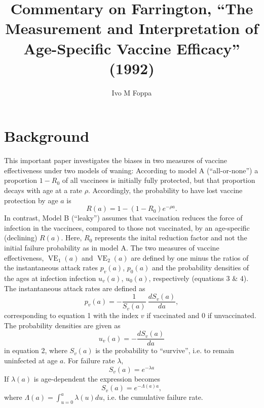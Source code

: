 \documentclass{article}[11pt]
\title{Commentary on Farrington, ``The Measurement and Interpretation of Age-Specific Vaccine Efficacy'' (1992)}
\author{Ivo M Foppa}
\begin{document}
	
\maketitle%
%
%
\section*{Background} 
This important paper investigates the biases in two measures of vaccine effectiveness under two models of waning: According to model A (``all-or-none'') a proportion $1-R_0$ of all vaccinees is initially fully protected, but that proportion decays with age at a rate $\rho$. Accordingly, the probability to have lost vaccine protection by age $a$ is
%
\begin{equation}
\label{eq:Ra}
R(a) = 1-(1-R_0) e^{-\rho a}.
\end{equation}
%
In contrast, Model B (``leaky'') assumes that vaccination reduces the force of infection in the vaccinees, compared to those not vaccinated, by an age-specific (declining) $R(a)$. Here, $R_0$ represents the inital reduction factor and not the initial failure probability as in model A.
The two measures of vaccine effectiveness, $\operatorname{VE}_1(a)$ and $\operatorname{VE}_2(a)$ are defined by one minus the ratios of the instantaneous attack rates $p_v(a)$, $p_0(a)$ and the  probability densities of the ages at infection infection $u_v(a)$, $u_0(a)$, respectively (equations 3 \& 4). The instantaneous attack rates are defined as 
%
\begin{equation}
\label{eq:inst_AR}
p_v(a) = - \frac{1}{S_v(a)} \:\frac{dS_v(a)}{da},
\end{equation}
%
corresponding to equation 1 with the index $v$ if vaccinated and $0$ if unvaccinated. The probability densities are given as
%
%
\begin{equation}
\label{eq:pd_age_inf}
u_v(a) = - \frac{dS_v(a)}{da}
\end{equation}
%
in equation 2, where $S_v(a)$ is the probability to ``survive'', i.e. to remain uninfected at age $a$. For failure rate $\lambda$,
%
\begin{equation}
\label{eq:surv_prob}
S_v(a) = e^{-\lambda a}
\end{equation}
%
If $\lambda(a)$ is age-dependent the expression becomes
%
\begin{equation}
\label{eq:surv_prob2}
S_v(a) = e^{-\Lambda(a) a},
\end{equation}
%
where $\Lambda(a) = \int_{u=0}^{a} \lambda(u) du$, i.e. the cumulative failure rate.
\end{document}
